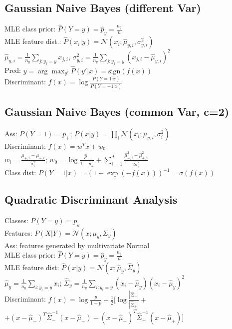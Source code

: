 \subsection*{Gaussian Naive Bayes (different Var)}
MLE class prior: $\hat{P}(Y=y) = \hat{p}_y = \frac{n_y}{n}$\\
MLE feature dist.: $\hat{P}(x_i|y)=\mathcal{N}(x_i;\hat{\mu}_{y,i}, \sigma_{y,i}^2)$\\
$\hat{\mu}_{y,i} = \frac{1}{n_y} \sum_{j:y_j=y} x_{j,i}$,  
$\sigma_{y,i}^2 = \frac{1}{n_y} \sum_{j:y_j=y} (x_{j,i} - \hat{\mu}_{y,i})^2$\\
Pred: $y = \arg\max_{y'} \hat{P}(y'|x) = \text{sign}(f(x))$\\
Discriminant: $ f(x)=\log\frac{P(Y=1|x)}{P(Y=-1|x)}$

\subsection*{Gaussian Naive Bayes (common Var, c=2)}
Ass: $P(Y=1)=p_+$; $P(x|y)=\prod_i \mathcal{N}(x_i;\mu_{y,i},\sigma^2_i) $ \\
Discriminant: $f(x)=w^Tx + w_0$\\
$w_i=\frac{\mu_{+,i}-\mu_{-,i}}{\sigma^2_i}$;  
$w_0=\log \frac{\hat{p}_+}{1-\hat{p}_+}+\sum_{i=1}^d \frac{\hat{\mu}^2_{-,i}-\hat{\mu}^2_{+,i}}{2\hat{\sigma}^2_i}$\\
Class dist: $P(Y=1|x)=(1+\exp(-f(x)))^{-1}=\sigma(f(x))$

\subsection*{Quadratic Discriminant Analysis}
Classes: $P(Y=y)=p_y$ \\
Features: $P(X|Y)=\mathcal{N}(x;\mu_y,\Sigma_y)$\\
Ass: features generated by multivariate Normal\\
MLE class prior: $ \hat{P}(Y=y)=\hat{p}_y=\frac{n_y}{n}$\\
MLE feature dist: $ \hat{P}(x|y)=\mathcal{N}(x;\hat{\mu}_y,\hat{\Sigma}_y)$\\
$\hat{\mu}_y=\frac{1}{n_y} \sum_{i:y_i=y} x_i$;  
$\hat{\Sigma}_y=\frac{1}{n_y}\sum_{i:y_i=y}(x_i-\hat{\mu}_y)(x_i-\hat{\mu}_y)^2$\\
Discriminant: $f(x)=\log\frac{p}{1-p}+\frac{1}{2}
\big[
\log \frac{|\hat{\Sigma}_-|}{|\hat{\Sigma}_+|}  + $\\
$+(x-\hat{\mu}_-)^T\hat{\Sigma}_-^{-1}(x-\hat{\mu}_-) -
(x-\hat{\mu}_+)^T\hat{\Sigma}_+^{-1}(x-\hat{\mu}_+) 
\big]$

